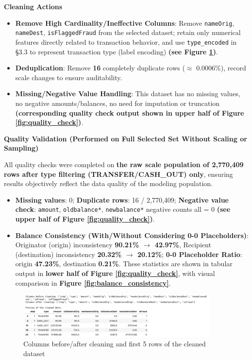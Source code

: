 \documentclass[sigplan,screen]{acmart}
\begin{document}
\textbf{Cleaning Actions}

\begin{itemize}
    \item \textbf{Remove High Cardinality/Ineffective Columns}: Remove \texttt{nameOrig}, \texttt{nameDest}, \texttt{isFlaggedFraud} from the selected dataset; retain only numerical features directly related to transaction behavior, and use \texttt{type\_encoded} in \S3.3 to represent transaction type (label encoding) \textbf{(see Figure \ref{fig:data_cleaning})}.
    \item \textbf{Deduplication}: Remove \textbf{16} completely duplicate rows ($\approx$ 0.0006\%), record scale changes to ensure auditability.
    \item \textbf{Missing/Negative Value Handling}: This dataset has no missing values, no negative amounts/balances, no need for imputation or truncation \textbf{(corresponding quality check output shown in upper half of Figure \ref{fig:quality_check})}.
\end{itemize}
    
\textbf{Quality Validation (Performed on Full Selected Set Without Scaling or Sampling)}

All quality checks were completed on \textbf{the raw scale population of 2,770,409 rows after type filtering (TRANSFER/CASH\_OUT) only}, ensuring results objectively reflect the data quality of the modeling population.

    \begin{itemize}
    \item \textbf{Missing values}: 0; \textbf{Duplicate rows}: 16 / 2,770,409; \textbf{Negative value check}: \texttt{amount}, \texttt{oldbalance*}, \texttt{newbalance*} negative counts all = 0 \textbf{(see upper half of Figure \ref{fig:quality_check})}.
    \item \textbf{Balance Consistency (With/Without Considering 0-0 Placeholders)}: Originator (origin) inconsistency \textbf{90.21\% $\rightarrow$ 42.97\%}, Recipient (destination) inconsistency \textbf{20.32\% $\rightarrow$ 20.12\%}; \textbf{0-0 Placeholder Ratio}: origin \textbf{47.23\%}, destination \textbf{0.21\%}. These statistics are shown in tabular output in \textbf{lower half of Figure \ref{fig:quality_check}}, with visual comparison in \textbf{Figure \ref{fig:balance_consistency}}.
    \end{itemize}

\begin{figure}[h!]
    \centering
    \includegraphics[width=0.9\textwidth]{3.2a.png}
    \caption{Columns before/after cleaning and first 5 rows of the cleaned dataset}
    \label{fig:data_cleaning}
\end{figure}
\end{document}
